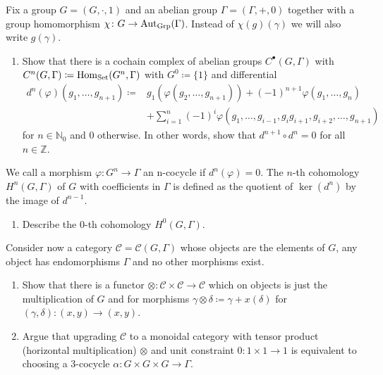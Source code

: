 \begin{Exercise}
	Fix a group $ G = ( G , \cdot , 1 ) $ and an abelian group $ \Gamma = ( \Gamma , + , 0 ) $ together with a group homomorphism $ \chi \colon G \to \operatorname{Aut}_{\operatorname{Grp}} ( \Gamma ) $.
	Instead of $ \chi ( g ) ( \gamma ) $ we will also write $ g ( \gamma ) $.
	\begin{enumerate}[label=(\alph*)]
		\item 
		Show that there is a cochain complex of abelian groups $ C^{ \bullet } ( G , \Gamma ) $ with $ C^n ( G , \Gamma ) \coloneqq \operatorname{Hom}_{ \operatorname{Set} } ( G^n , \Gamma ) $ with $ G^0 \coloneqq \{ 1\}$ and differential 
		\begin{align*}
			d^n ( \varphi ) ( g_1 , \dotsc ,  g_{n+1} ) 
			\coloneqq&
			g_1 ( \varphi ( g_2 , \dotsc ,  g_{n+1} ) ) + ( - 1 )^{ n + 1 } \varphi ( g_1 , \dotsc ,  g_n ) 
			\\
			&+ \sum_{i = 1}^n ( - 1 )^i \varphi ( g_1 , \dotsc ,  g_{ i-1 } , g_ig_{i+1} , g_{i+2}, \dotsc ,  g_{n+1} )
		\end{align*}
		for $ n \in \mathbb{ N }_0 $ and $ 0 $ otherwise. 
		In other words, show that $ d^{n+1} \circ d^n = 0 $ for all $ n \in \mathbb{ Z } $.
	\end{enumerate}
	
	We call a morphism $ \varphi \colon G^n \to \Gamma  $ an n-cocycle if $ d^n ( \varphi ) = 0 $.
	The $ n $-th cohomology $ H^n ( G , \Gamma ) $ of $ G $ with coefficients in $ \Gamma $ is defined as the quotient of $ \ker ( d^n ) $ by the image of $d^{n-1}$.
	
	\begin{enumerate}[resume, label=(\alph*)]
		\item 
		Describe the 0-th cohomology $ H^0 ( G , \Gamma ) $.
	\end{enumerate}
	
	Consider now a category $ \mathcal{ C } = \mathcal{ C } ( G , \Gamma ) $ whose objects are the elements of $ G $, any object has endomorphisms $ \Gamma $ and no other morphisms exist.
	
	\begin{enumerate}[resume, label=(\alph*)]
		\item 
		Show that there is a functor $ \otimes \colon \mathcal{ C } \times \mathcal{ C } \to \mathcal{ C } $ which on objects is just the multiplication of $ G $ and for morphisms $ \gamma \otimes \delta \coloneqq \gamma + x ( \delta ) $ for $ ( \gamma, \delta ) \colon ( x , y ) \to ( x, y ) $.
		
		\item 
		Argue that upgrading $ \mathcal{ C } $ to a monoidal category with tensor product (horizontal multiplication) $ \otimes $ and unit constraint $ 0 \colon 1 \times 1 \to 1 $ is equivalent to choosing a $ 3 $-cocycle $ \alpha \colon G \times G \times G \to \Gamma$.
	\end{enumerate}
\end{Exercise}

